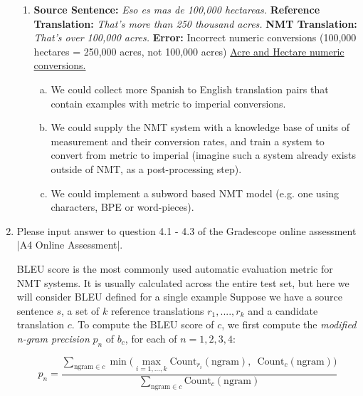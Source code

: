 \begin{enumerate}[1.]
\begin{enumerate}[3a.]

\item {}

{\bf Source Sentence:} {\em Eso es mas de 100,000 hectareas.}
\newline
{\bf Reference Translation:} {\em That's more than 250 thousand acres.}
\newline
{\bf NMT Translation:} {\em That's over 100,000 acres.}
\newline
{\bf Error:} Incorrect numeric conversions (100,000 hectares = 250,000 acres, not 100,000 acres)
\newline
\href{https://www.unitconverters.net/area/acres-to-hectare.htm}{Acre and Hectare numeric conversions.}

\begin{enumerate}[(a)]
\item We could collect more Spanish to English translation pairs that contain examples with metric to imperial conversions.
\item We could supply the NMT system with a knowledge base of units of measurement and their conversion rates, and train a system to convert from metric to imperial (imagine such a system already exists outside of NMT, as a post-processing step).
\item We could implement a subword based NMT model (e.g. one using characters, BPE or word-pieces).
\end{enumerate}


\end{enumerate}

\item 
Please input answer to question 4.1 - 4.3 of the Gradescope online assessment |A4 Online Assessment|.

BLEU score is the most commonly used automatic evaluation metric for NMT systems. It is usually calculated across the entire test set, but here we will consider BLEU defined for a single example Suppose we have a source sentence $s$, a set of $k$ reference translations $r_1,....,r_k$ and a candidate translation $c$. To compute the BLEU score of $c$, we first compute the {\em modified n-gram precision} $p_n$ of $b_c$, for each of $n = 1, 2, 3, 4$:

\begin{equation*}
p_n = \frac{ \displaystyle \sum_{\text{ngram} \in c} \min \bigg( \max_{i=1,\dots,k} \text{Count}_{r_i}(\text{ngram}), \enspace \text{Count}_{c}(\text{ngram}) \bigg) }{\displaystyle \sum_{\text{ngram}\in c} \text{Count}_{c}(\text{ngram})}
\end{equation*}


\end{enumerate}
